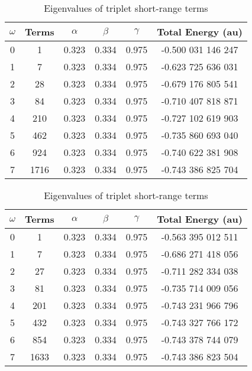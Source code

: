 \documentclass[Dissertation.tex]{subfiles}
\begin{document}
\setlength{\abovecaptionskip}{6pt}   %
\setlength{\belowcaptionskip}{6pt}   %
\begin{table}[H]
\centering
\begin{tabular}{c c c c c c}
\toprule
$\omega$ & Terms & $\alpha$ & $\beta$ & $\gamma$ & Total Energy (au) \\ [0.5ex]
\midrule
0 & 1 & 0.323 & 0.334 & 0.975 & -0.500 031 146 247 \\
1 & 7 & 0.323 & 0.334 & 0.975 & -0.623 725 636 031 \\
2 & 28 & 0.323 & 0.334 & 0.975 & -0.679 176 805 541 \\
3 & 84 & 0.323 & 0.334 & 0.975 & -0.710 407 818 871 \\
4 & 210 & 0.323 & 0.334 & 0.975 & -0.727 102 619 903 \\
5 & 462 & 0.323 & 0.334 & 0.975 & -0.735 860 693 040 \\
6 & 924 & 0.323 & 0.334 & 0.975 & -0.740 622 381 908 \\
7 & 1716 & 0.323 & 0.334 & 0.975 & -0.743 386 825 704 \\
\bottomrule
\end{tabular}
\caption{Eigenvalues of triplet short-range terms} %
\label{tab:BoundEnergy3}
\end{table}


\setlength{\abovecaptionskip}{6pt}   %
\setlength{\belowcaptionskip}{6pt}   %
\begin{table}[H]
\centering
\begin{tabular}{c c c c c c}
\toprule
$\omega$ & Terms & $\alpha$ & $\beta$ & $\gamma$ & Total Energy (au) \\ [0.5ex]
\midrule
0 & 1 & 0.323 & 0.334 & 0.975 & -0.563 395 012 511 \\
1 & 7 & 0.323 & 0.334 & 0.975 & -0.686 271 418 056 \\
2 & 27 & 0.323 & 0.334 & 0.975 & -0.711 282 334 038 \\
3 & 81 & 0.323 & 0.334 & 0.975 & -0.735 714 009 056 \\
4 & 201 & 0.323 & 0.334 & 0.975 & -0.743 231 966 796 \\
5 & 432 & 0.323 & 0.334 & 0.975 & -0.743 327 766 172 \\
6 & 854 & 0.323 & 0.334 & 0.975 & -0.743 378 744 079 \\
7 & 1633 & 0.323 & 0.334 & 0.975 & -0.743 386 823 504 \\
\bottomrule
\end{tabular}
\caption{Eigenvalues of triplet short-range terms} %
\label{tab:BoundEnergyTodd3}
\end{table}
\end{document}
